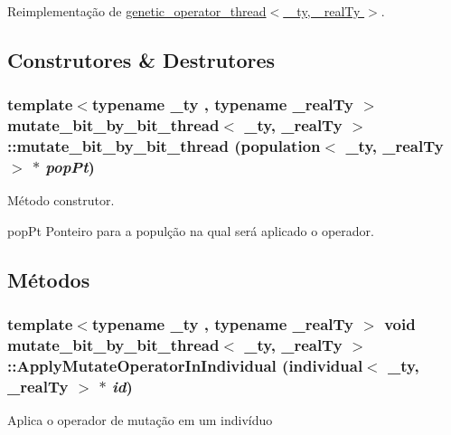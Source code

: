Reimplementação de \hyperlink{classgenetic__operator__thread_abe926f8fc2a1548516dad216a1acd4fb}{genetic\_\-operator\_\-thread$<$ \_\-ty, \_\-realTy $>$}.



\subsection{Construtores \& Destrutores}
\hypertarget{classmutate__bit__by__bit__thread_a3f2bb991bf06934cb614d2fb91f2bf0a}{
\subsubsection[{mutate\_\-bit\_\-by\_\-bit\_\-thread}]{\setlength{\rightskip}{0pt plus 5cm}template$<$typename \_\-ty , typename \_\-realTy $>$ {\bf mutate\_\-bit\_\-by\_\-bit\_\-thread}$<$ \_\-ty, \_\-realTy $>$::{\bf mutate\_\-bit\_\-by\_\-bit\_\-thread} ({\bf population}$<$ \_\-ty, \_\-realTy $>$ $\ast$ {\em popPt})}}
\label{classmutate__bit__by__bit__thread_a3f2bb991bf06934cb614d2fb91f2bf0a}
Método construtor.

popPt Ponteiro para a populção na qual será aplicado o operador. 

\subsection{Métodos}
\hypertarget{classmutate__bit__by__bit__thread_a452b4832fd083ab19d3f3f65b79bf271}{
\subsubsection[{ApplyMutateOperatorInIndividual}]{\setlength{\rightskip}{0pt plus 5cm}template$<$typename \_\-ty , typename \_\-realTy $>$ void {\bf mutate\_\-bit\_\-by\_\-bit\_\-thread}$<$ \_\-ty, \_\-realTy $>$::ApplyMutateOperatorInIndividual ({\bf individual}$<$ \_\-ty, \_\-realTy $>$ $\ast$ {\em id})}}
\label{classmutate__bit__by__bit__thread_a452b4832fd083ab19d3f3f65b79bf271}
Aplica o operador de mutação em um indivíduo

